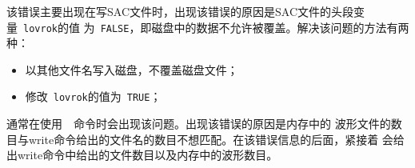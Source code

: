 该错误主要出现在写SAC文件时，出现该错误的原因是SAC文件的头段变量~\verb+lovrok+的值
为~\verb+FALSE+，即磁盘中的数据不允许被覆盖。解决该问题的方法有两种：
\begin{itemize}
\item 以其他文件名写入磁盘，不覆盖磁盘文件；
\item 修改~\verb+lovrok+的值为~\verb+TRUE+；
\end{itemize}

通常在使用~~命令时会出现该问题。出现该错误的原因是内存中的
波形文件的数目与write命令给出的文件名的数目不想匹配。在该错误信息的后面，紧接着
会给出write命令中给出的文件数目以及内存中的波形数目。
